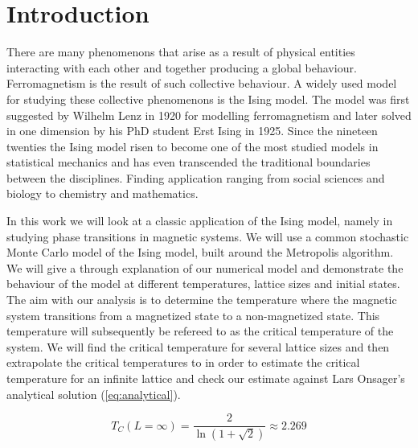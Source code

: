 \section{Introduction}
There are many phenomenons that arise as a result of physical entities
interacting with each other and together producing a global behaviour.
Ferromagnetism is the result of such collective behaviour. A widely used model
for studying these collective phenomenons is the Ising model.
The model was first suggested by Wilhelm Lenz in 1920 for modelling
ferromagnetism and later solved 
in one dimension by his PhD student Erst Ising in 1925. Since the nineteen
twenties the Ising model risen to become one of the most studied models in
statistical mechanics and has even
transcended the traditional boundaries between the disciplines. Finding
application ranging from social sciences and biology to chemistry and
mathematics.

In this work we will look at a classic application of the Ising model, namely
in studying phase transitions in magnetic systems. We will use a common
stochastic Monte Carlo model of the Ising model, built around the Metropolis algorithm. We will give a through explanation of our numerical model
and demonstrate the behaviour of the model at different temperatures, lattice
sizes and initial states. The aim with our analysis is to determine the
temperature where the magnetic system transitions from a 
magnetized state to a non-magnetized state. This
temperature will subsequently be refereed to as the critical
temperature of the system. We will find the critical temperature for several lattice sizes
and then extrapolate the critical temperatures to in order to estimate the
critical temperature for an infinite lattice and
check our estimate against Lars Onsager's analytical solution (\cref{eq:analytical}).

\begin{equation}
  \label{eq:analytical}
  T_C(L=\infty) = \frac{2}{\ln(1 + \sqrt2)} \approx 2.269
\end{equation}



